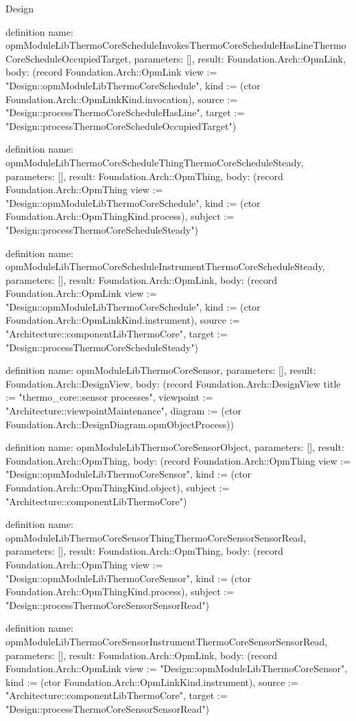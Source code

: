 \begin{lexlean}{Design}
\begin{semanticmodule}
definition{
  name: opmModuleLibThermoCoreScheduleInvokesThermoCoreScheduleHasLineThermoCoreScheduleOccupiedTarget,
  parameters: [],
  result: Foundation.Arch::OpmLink,
  body: (record Foundation.Arch::OpmLink {view := "Design::opmModuleLibThermoCoreSchedule", kind := (ctor Foundation.Arch::OpmLinkKind.invocation), source := "Design::processThermoCoreScheduleHasLine", target := "Design::processThermoCoreScheduleOccupiedTarget"})
}

definition{
  name: opmModuleLibThermoCoreScheduleThingThermoCoreScheduleSteady,
  parameters: [],
  result: Foundation.Arch::OpmThing,
  body: (record Foundation.Arch::OpmThing {view := "Design::opmModuleLibThermoCoreSchedule", kind := (ctor Foundation.Arch::OpmThingKind.process), subject := "Design::processThermoCoreScheduleSteady"})
}

definition{
  name: opmModuleLibThermoCoreScheduleInstrumentThermoCoreScheduleSteady,
  parameters: [],
  result: Foundation.Arch::OpmLink,
  body: (record Foundation.Arch::OpmLink {view := "Design::opmModuleLibThermoCoreSchedule", kind := (ctor Foundation.Arch::OpmLinkKind.instrument), source := "Architecture::componentLibThermoCore", target := "Design::processThermoCoreScheduleSteady"})
}

definition{
  name: opmModuleLibThermoCoreSensor,
  parameters: [],
  result: Foundation.Arch::DesignView,
  body: (record Foundation.Arch::DesignView {title := "thermo_core::sensor processes", viewpoint := "Architecture::viewpointMaintenance", diagram := (ctor Foundation.Arch::DesignDiagram.opmObjectProcess)})
}

definition{
  name: opmModuleLibThermoCoreSensorObject,
  parameters: [],
  result: Foundation.Arch::OpmThing,
  body: (record Foundation.Arch::OpmThing {view := "Design::opmModuleLibThermoCoreSensor", kind := (ctor Foundation.Arch::OpmThingKind.object), subject := "Architecture::componentLibThermoCore"})
}

definition{
  name: opmModuleLibThermoCoreSensorThingThermoCoreSensorSensorRead,
  parameters: [],
  result: Foundation.Arch::OpmThing,
  body: (record Foundation.Arch::OpmThing {view := "Design::opmModuleLibThermoCoreSensor", kind := (ctor Foundation.Arch::OpmThingKind.process), subject := "Design::processThermoCoreSensorSensorRead"})
}

definition{
  name: opmModuleLibThermoCoreSensorInstrumentThermoCoreSensorSensorRead,
  parameters: [],
  result: Foundation.Arch::OpmLink,
  body: (record Foundation.Arch::OpmLink {view := "Design::opmModuleLibThermoCoreSensor", kind := (ctor Foundation.Arch::OpmLinkKind.instrument), source := "Architecture::componentLibThermoCore", target := "Design::processThermoCoreSensorSensorRead"})
}


\end{semanticmodule}
\end{lexlean}
